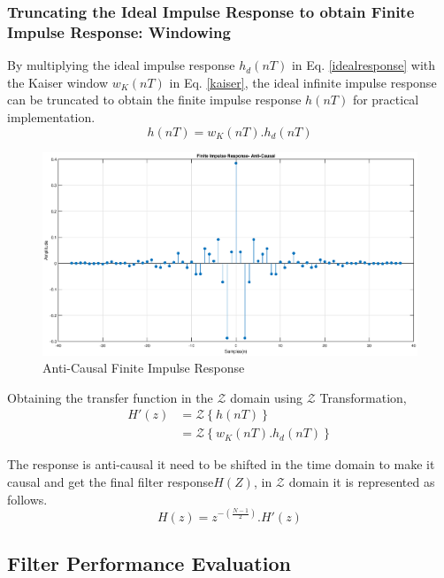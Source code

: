\documentclass[a4paper,11pt]{article}%
\begin{document}
\subsubsection{Truncating the Ideal Impulse Response to obtain Finite Impulse Response: Windowing}

By multiplying the ideal impulse response $h_d(nT)$ in Eq. \eqref{idealresponse} with the Kaiser window $w_K(nT)$ in Eq. \eqref{kaiser}, the ideal infinite impulse response can be truncated to obtain the finite impulse response $h(nT)$ for practical implementation.
\begin{equation}
h(nT) = 	w_K(nT).h_d(nT)
\end{equation}

\begin{figure}[!h]
	\centering
	\includegraphics[scale=0.4]{figures/fir-truncated}
	\caption{Anti-Causal Finite Impulse Response}
\end{figure}

Obtaining the transfer function in the $\mathcal{Z}$ domain using $\mathcal{Z}$ Transformation,
\begin{equation}
	\begin{split}
			H'(z) &= \mathcal{Z}\left\{ h(nT) \right\}\\
		&=\mathcal{Z}\left\{ w_K(nT).h_d(nT) \right\}
	\end{split}
\end{equation}

The response is anti-causal it need to be shifted in the time domain to make it causal and get the final filter response$H(Z)$, in $\mathcal{Z}$ domain it is represented as follows.
\begin{equation}
	H(z)= z^{-\left(\frac{N-1}{2}\right)}.H'(z)
\end{equation}

\subsection{Filter Performance Evaluation}
\end{document}
